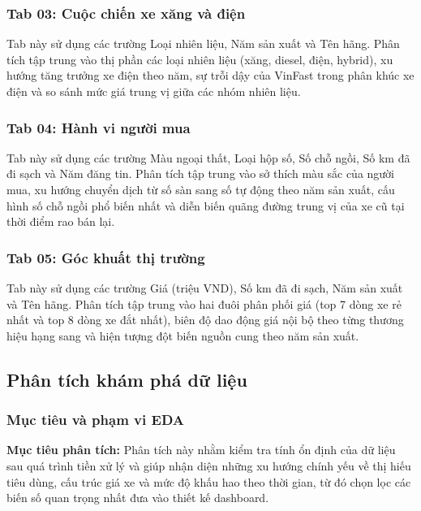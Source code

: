 \subsubsection{Tab 03: Cuộc chiến xe xăng và điện}

Tab này sử dụng các trường Loại nhiên liệu, Năm sản xuất và Tên hãng. Phân tích tập trung vào thị phần các loại nhiên liệu (xăng, diesel, điện, hybrid), xu hướng tăng trưởng xe điện theo năm, sự trỗi dậy của VinFast trong phân khúc xe điện và so sánh mức giá trung vị giữa các nhóm nhiên liệu.

\subsubsection{Tab 04: Hành vi người mua}

Tab này sử dụng các trường Màu ngoại thất, Loại hộp số, Số chỗ ngồi, Số km đã đi sạch và Năm đăng tin. Phân tích tập trung vào sở thích màu sắc của người mua, xu hướng chuyển dịch từ số sàn sang số tự động theo năm sản xuất, cấu hình số chỗ ngồi phổ biến nhất và diễn biến quãng đường trung vị của xe cũ tại thời điểm rao bán lại.

\subsubsection{Tab 05: Góc khuất thị trường}

Tab này sử dụng các trường Giá (triệu VND), Số km đã đi sạch, Năm sản xuất và Tên hãng. Phân tích tập trung vào hai đuôi phân phối giá (top 7 dòng xe rẻ nhất và top 8 dòng xe đắt nhất), biên độ dao động giá nội bộ theo từng thương hiệu hạng sang và hiện tượng đột biến nguồn cung theo năm sản xuất.

\subsection{Phân tích khám phá dữ liệu}

\subsubsection{Mục tiêu và phạm vi EDA}

\textbf{Mục tiêu phân tích:} Phân tích này nhằm kiểm tra tính ổn định của dữ liệu sau quá trình tiền xử lý và giúp nhận diện những xu hướng chính yếu về thị hiếu tiêu dùng, cấu trúc giá xe và mức độ khấu hao theo thời gian, từ đó chọn lọc các biến số quan trọng nhất đưa vào thiết kế dashboard.

